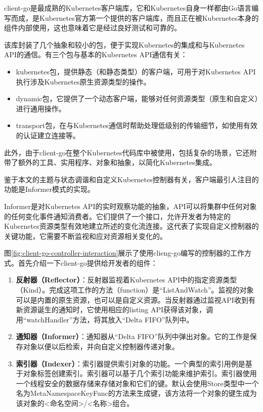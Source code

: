 \documentclass[macfonts,master]{njuthesis}
\begin{document}
client-go是最成熟的Kubernetes客户端库，它和Kubernetes自身一样都由Go语言编写而成，是Kubernetes官方第一个提供的客户端库，而且正在被Kubernetes本身的组件内部使用，这也意味着它是经过良好测试和可靠的\cite{controllerclientgo}。

该库封装了几个抽象和较小的包，便于实现Kubernetes的集成和与Kubernetes API的通信。有三个包与基本的Kubernetes API通信有关\cite{controllerclientgo}：

\begin{itemize}
	\item kubernetes包，提供静态（和静态类型）的客户端，可用于对Kubernetes API执行涉及Kubernetes原生资源类型的操作。
	\item dynamic包，它提供了一个动态客户端，能够对任何资源类型（原生和自定义）进行通用操作。
	\item transport包，在与Kubernetes通信时帮助处理低级别的传输细节，如使用有效的认证建立连接等。
\end{itemize}

此外，由于client-go在整个Kubernetes代码库中被使用，包括复杂的场景，它还附带了额外的工具、实用程序、对象和抽象，以简化Kubernetes集成。

鉴于本文的主题与状态调谐和自定义Kubernetes控制器有关，客户端最引人注目的功能是Informer模式的实现\cite{informer}。

Informer是对Kubernetes API的实时观察功能的抽象，API可以将集群中任何对象的任何变化事件通知消费者。它们提供了一个接口，允许开发者为特定的Kubernetes资源类型有效地建立所述的变化流连接\cite{informer}。这代表了实现自定义控制器的关键功能，它需要不断监视和应对资源相关变化的。

图\ref{fig:client-go-controller-interaction}展示了使用clieng-go编写的控制器的工作方式。首先介绍一下client-go提供给开发者的组件：
\begin{enumerate}
	\item \textbf{反射器（Reflector）}：反射器监视着Kubernetes API中的指定资源类型（Kind）。完成这项工作的方法（function）是``ListAndWatch''。监视的对象可以是内置的原生资源，也可以是自定义资源。当反射器通过监视API收到有新资源诞生的通知时，它使用相应的listing API获得该对象，调用``watchHandler''方法，将其放入``Delta FIFO''队列中。
	\item \textbf{通知器（Informer）}：通知器从``Delta FIFO''队列中弹出对象。它的工作是保存对象以便以后检索，并向自定义控制器传递对象。
	\item \textbf{索引器（Indexer）}：索引器提供索引对象的功能。一个典型的索引用例是基于对象标签创建索引。索引器可以基于几个索引功能来维护索引。索引器使用一个线程安全的数据存储来存储对象和它们的键。默认会使用Store类型中一个名为MetaNamespaceKeyFunc的方法来生成键，该方法将一个对象的键生成为该对象的<命名空间>/<名称>组合。
\end{enumerate}
\end{document}
